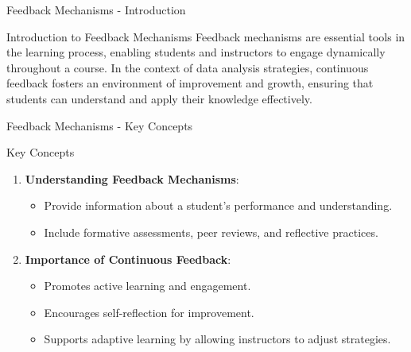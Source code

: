 \documentclass[aspectratio=169]{beamer}
\begin{document}
\begin{frame}[fragile]{Feedback Mechanisms - Introduction}
    \begin{block}{Introduction to Feedback Mechanisms}
        Feedback mechanisms are essential tools in the learning process, enabling students and instructors to engage dynamically throughout a course. 
        In the context of data analysis strategies, continuous feedback fosters an environment of improvement and growth, ensuring that students can understand and apply their knowledge effectively.
    \end{block}
\end{frame}

\begin{frame}[fragile]{Feedback Mechanisms - Key Concepts}
    \begin{block}{Key Concepts}
        \begin{enumerate}
            \item \textbf{Understanding Feedback Mechanisms}:
                \begin{itemize}
                    \item Provide information about a student’s performance and understanding.
                    \item Include formative assessments, peer reviews, and reflective practices.
                \end{itemize}
                
            \item \textbf{Importance of Continuous Feedback}:
                \begin{itemize}
                    \item Promotes active learning and engagement.
                    \item Encourages self-reflection for improvement.
                    \item Supports adaptive learning by allowing instructors to adjust strategies.
                \end{itemize}
        \end{enumerate}
    \end{block}
\end{frame}
\end{document}
